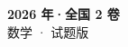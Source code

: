 \documentclass[zihao=-4, a4paper]{ctexart}
\begin{document}
\begin{center}
  {\Large\bfseries 2026 年·全国 2 卷}\\[4pt]
  {\large 数学 · 试题版}
\end{center}
\medskip
{}

\end{document}
